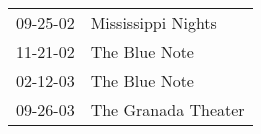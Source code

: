 \begin{supertabular}{p{0.07\textwidth}p{0.23\textwidth}}
 09-25-02 &   Mississippi Nights \\
 11-21-02 &        The Blue Note \\
 02-12-03 &        The Blue Note \\
 09-26-03 &  The Granada Theater \\
\end{supertabular}
